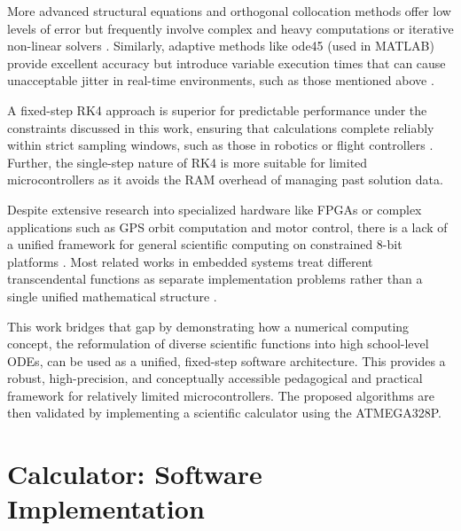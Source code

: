 \documentclass[conference]{IEEEtran}
\newcommand{\rev}[1]{{\color{black}#1}}
\begin{document}
More advanced structural equations and orthogonal collocation methods offer low levels of error but frequently involve complex and heavy computations or iterative non-linear solvers \cite{allamaa2023}. Similarly, adaptive methods like ode45 (used in MATLAB) provide excellent accuracy but introduce variable execution times that can cause unacceptable jitter in real-time environments, such as those mentioned above \cite{AkpunarBozkurt2026}. 

A fixed-step RK4 approach is superior for predictable performance under the constraints discussed in this work, ensuring that calculations complete reliably within strict sampling windows, such as those in robotics or flight controllers \cite{Murugesan2002}.
Further,  the single-step nature of RK4 is more suitable for limited microcontrollers as it avoids the RAM overhead of managing past solution data.

Despite extensive research into specialized hardware like FPGAs or complex applications such as GPS orbit computation and motor control, \rev{there is a lack of a unified framework for general scientific computing on constrained 8-bit platforms} \cite{Medjahed2024, AkpunarBozkurt2026}. Most related works in embedded systems treat different transcendental functions as separate implementation problems rather than a single unified mathematical structure \cite{Moroz2023}. 


\rev{This work bridges that gap by demonstrating how a numerical computing concept, the reformulation of diverse scientific functions into high school-level ODEs, can be used as a unified, fixed-step software architecture. This provides a robust, high-precision, and conceptually accessible pedagogical and practical framework for relatively limited microcontrollers. The proposed algorithms are then validated by implementing a scientific calculator using the ATMEGA328P.}

\section{Calculator: Software Implementation}
\end{document}
